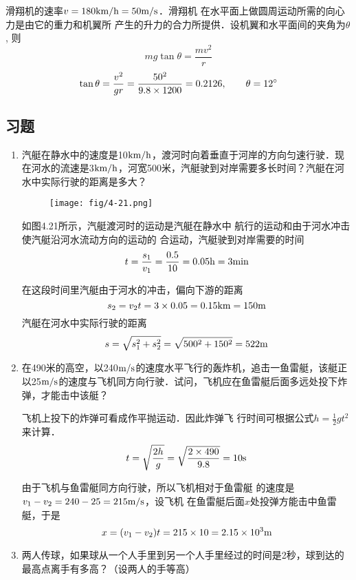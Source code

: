 \begin{enumerate}
\begin{solution}
    滑翔机的速率$v=180\text{km}/\text{h}=50\text{m}/\text{s}$．滑翔机
    在水平面上做圆周运动所需的向心力是由它的重力和机翼所
    产生的升力的合力所提供．设机翼和水平面间的夹角为$\theta$, 则
    \[mg\tan\theta=\frac{mv^2}{r}\]
    \[\tan\theta=\frac{v^2}{gr}=\frac{50^2}{9.8\times 1200}=0.2126,\qquad \theta=12^{\circ}\]
\end{solution}
\end{enumerate}





\subsection{习题}

\begin{enumerate}
	\item 汽艇在静水中的速度是10$\text{km}/\text{h}$，渡河时向着垂直于河岸的方向匀速行驶．现在河水的流速是3$\text{km}/\text{h}$，河宽500米，汽艇驶到对岸需要多长时间？汽艇在河水中实际行驶的距离是多大？
    \begin{figure}[htp]
        \centering
        \texttt{[image: fig/4-21.png]}
        \caption{}
        \end{figure}

    \begin{solution}
如图4.21所示，汽艇渡河时的运动是汽艇在静水中
航行的运动和由于河水冲击使汽艇沿河水流动方向的运动的
合运动，汽艇驶到对岸需要的时间
\[t=\frac{s_1}{v_1}=\frac{0.5}{10}=0.05{\rm h}=3{\rm min}\]

在这段时间里汽艇由于河水的冲击，偏向下游的距离
\[s_2=v_2t=3\times0.05=0.15{\rm km }=150{\rm m}\]
汽艇在河水中实际行驶的距离
\[s=\sqrt{s_1^2+s_2^2}=\sqrt{500^2+150^2}=522{\rm m}\]    
    \end{solution}
\item 在490米的高空，以240$\text{m}/\text{s}$的速度水平飞行的轰炸机，追击一鱼雷艇，该艇正以25$\text{m}/\text{s}$的速度与飞机同方向行驶．试问，飞机应在鱼雷艇后面多远处投下炸弹，才能击中该艇？

\begin{solution}
    飞机上投下的炸弹可看成作平抛运动．因此炸弹飞
    行时间可根据公式$h=\frac{1}{2}gt^2$来计算．
\[t=\sqrt{\frac{2h}{g}}=\sqrt{\frac{2\times 490}{9.8}}=10{\rm s}\]

由于飞机与鱼雷艇同方向行驶，所以飞机相对于鱼雷艇
的速度是$v_1-v_2=240-25=215\text{m}/\text{s}$，设飞机
在鱼雷艇后面$x$处投弹方能击中鱼雷艇，于是
\[x=(v_1-v_2)t=215\times10=2.15\times10^3{\rm m}\]
\end{solution}
\item 两人传球，如果球从一个人手里到另一个人手里经过的时间是2秒，球到达的最高点离手有多高？（设两人的手等高）


\end{enumerate}
